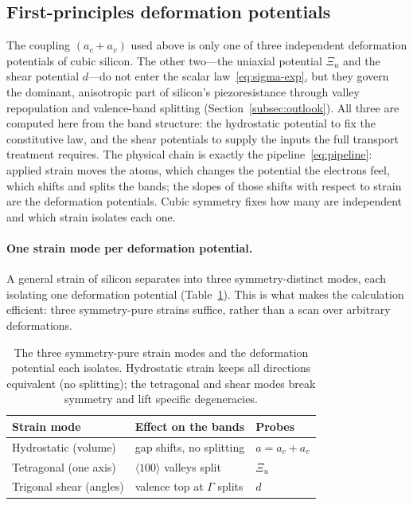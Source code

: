 
\subsection{First-principles deformation potentials}
\label{subsec:dft-results}
The coupling $(a_c+a_v)$ used above is only one of three independent deformation
potentials of cubic silicon. The other two---the uniaxial potential $\Xi_u$ and
the shear potential $d$---do not enter the scalar law~\eqref{eq:sigma-exp}, but
they govern the dominant, anisotropic part of silicon's piezoresistance through
valley repopulation and valence-band splitting (Section~\ref{subsec:outlook}).
All three are computed here from the band structure: the hydrostatic potential to
fix the constitutive law, and the shear potentials to supply the inputs the full
transport treatment requires. The physical chain is exactly the
pipeline~\eqref{eq:pipeline}: applied strain moves the atoms, which changes the
potential the electrons feel, which shifts and splits the bands; the slopes of
those shifts with respect to strain are the deformation potentials. Cubic symmetry
fixes how many are independent and which strain isolates each one.

\paragraph{One strain mode per deformation potential.}
A general strain of silicon separates into three symmetry-distinct modes, each
isolating one deformation potential (Table~\ref{tab:strain-modes}). This is what
makes the calculation efficient: three symmetry-pure strains suffice, rather
than a scan over arbitrary deformations.

\begin{table}[ht]
  \centering
  \begin{tabular}{lll}
    \toprule
    Strain mode & Effect on the bands & Probes \\
    \midrule
    Hydrostatic (volume) & gap shifts, no splitting          & $a = a_c+a_v$ \\
    Tetragonal (one axis) & $\langle100\rangle$ valleys split & $\Xi_u$ \\
    Trigonal shear (angles) & valence top at $\Gamma$ splits  & $d$ \\
    \bottomrule
  \end{tabular}
  \caption{The three symmetry-pure strain modes and the deformation potential
  each isolates. Hydrostatic strain keeps all directions equivalent (no
  splitting); the tetragonal and shear modes break symmetry and lift specific
  degeneracies.}
  \label{tab:strain-modes}
\end{table}

